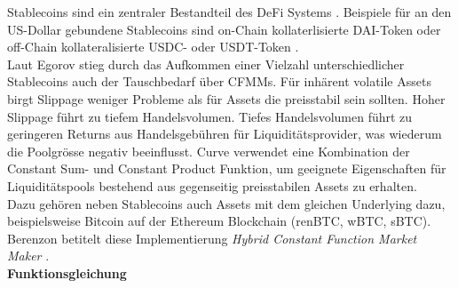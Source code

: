 \documentclass[12pt,a4paper,titlepage,oneside,english]{article}
\begin{document}
Stablecoins sind ein zentraler Bestandteil des DeFi Systems \citep[S.1]{Egorov2019}. Beispiele für an den US-Dollar gebundene Stablecoins sind on-Chain kollaterlisierte DAI-Token oder off-Chain kollateralisierte USDC- oder USDT-Token \citep[S.6]{Schaer2020}. \\ 
Laut Egorov stieg durch das Aufkommen einer Vielzahl unterschiedlicher Stablecoins auch der Tauschbedarf über CFMMs. Für inhärent volatile Assets %
birgt Slippage weniger Probleme als für Assets die preisstabil sein sollten.  Hoher Slippage führt zu tiefem Handelsvolumen. Tiefes Handelsvolumen führt zu geringeren Returns aus Handelsgebühren für Liquiditätsprovider, was wiederum die Poolgrösse negativ beeinflusst. Curve verwendet eine Kombination der Constant Sum- und Constant Product Funktion, um geeignete Eigenschaften für Liquiditätspools bestehend aus gegenseitig preisstabilen Assets zu erhalten. \citep[vgl.][S.1]{Egorov2019} \\ Dazu gehören neben Stablecoins auch Assets mit dem gleichen Underlying dazu, beispielsweise Bitcoin auf der Ethereum Blockchain (renBTC, wBTC, sBTC).
Berenzon betitelt diese Implementierung \textit{Hybrid Constant Function Market Maker} \citep{Berenzon2020}.\\
\newpage
\textbf{Funktionsgleichung}
\end{document}
